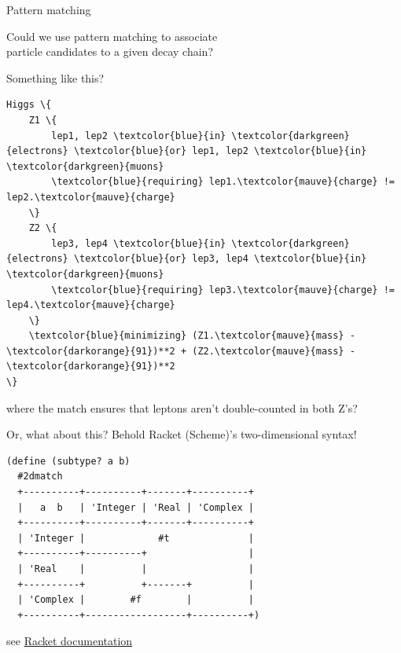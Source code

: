 \documentclass[aspectratio=169]{beamer}
\begin{document}
\begin{frame}{Pattern matching}
\LARGE
\vspace{0.5 cm}
\begin{center}
Could we use pattern matching to associate \\ particle candidates to a given decay chain?
\end{center}
\end{frame}

\begin{frame}[fragile]{Something like this?}
\begin{Verbatim}[commandchars=\\\{\}]
Higgs \{
    Z1 \{
        lep1, lep2 \textcolor{blue}{in} \textcolor{darkgreen}{electrons} \textcolor{blue}{or} lep1, lep2 \textcolor{blue}{in} \textcolor{darkgreen}{muons}
        \textcolor{blue}{requiring} lep1.\textcolor{mauve}{charge} != lep2.\textcolor{mauve}{charge}
    \}
    Z2 \{
        lep3, lep4 \textcolor{blue}{in} \textcolor{darkgreen}{electrons} \textcolor{blue}{or} lep3, lep4 \textcolor{blue}{in} \textcolor{darkgreen}{muons}
        \textcolor{blue}{requiring} lep3.\textcolor{mauve}{charge} != lep4.\textcolor{mauve}{charge}
    \}
    \textcolor{blue}{minimizing} (Z1.\textcolor{mauve}{mass} - \textcolor{darkorange}{91})**2 + (Z2.\textcolor{mauve}{mass} - \textcolor{darkorange}{91})**2
\}
\end{Verbatim}

\large
\vspace{0.5 cm}
where the match ensures that leptons aren't double-counted in both Z's?
\end{frame}

\begin{frame}[fragile]{Or, what about this?}
\Large
\vspace{0.5 cm}
Behold Racket (Scheme)'s two-dimensional syntax!

\normalsize

\vspace{0.25 cm}
\begin{center}
\begin{minipage}{0.8\linewidth}
\begin{verbatim}
(define (subtype? a b)
  #2dmatch
  +----------+----------+-------+----------+
  |   a  b   | 'Integer | 'Real | 'Complex |
  +----------+----------+-------+----------+
  | 'Integer |             #t              |
  +----------+----------+                  |
  | 'Real    |          |                  |
  +----------+          +-------+          |
  | 'Complex |        #f        |          |
  +----------+------------------+----------+)
\end{verbatim}
\end{minipage}
\end{center}

\vspace{0.25 cm}
\small \hfill see \textcolor{blue}{\href{https://docs.racket-lang.org/2d/index.html}{Racket documentation}}
\end{frame}
\end{document}
